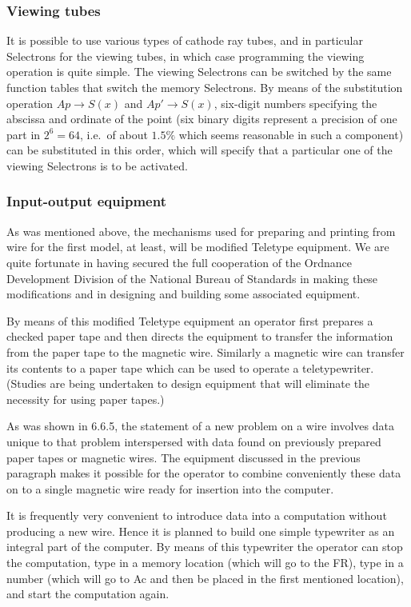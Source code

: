 \documentclass[12pt]{amsart}
\begin{document}
\subsubsection{Viewing tubes}
It is possible to use various types of cathode ray tubes, and in particular Selectrons for the viewing tubes, in which case programming the viewing operation is quite simple. The viewing Selectrons can be switched by the same function tables that switch the memory Selectrons. By means of the substitution operation $Ap \rightarrow S(x)$ and $Ap' \rightarrow S(x)$, six-digit numbers specifying the abscissa and ordinate of the point (six binary digits represent a precision of one part in $2^6 = 64$, i.e.\ of about $1.5\%$ which seems reasonable in such a component) can be substituted in this order, which will specify that a particular one of the viewing Selectrons is to be activated.

\subsubsection{Input-output equipment}
As was mentioned above, the mechanisms used for preparing and printing from wire for the first model, at least, will be modified Teletype equipment. We are quite fortunate in having secured the full cooperation of the Ordnance Development Division of the National Bureau of Standards in making these modifications and in designing and building some associated equipment.

By means of this modified Teletype equipment an operator first prepares a checked paper tape and then directs the equipment to transfer the information from the paper tape to the magnetic wire. Similarly a magnetic wire can transfer its contents to a paper tape which can be used to operate a teletypewriter. (Studies are being undertaken to design equipment that will eliminate the necessity for using paper tapes.)

As was shown in 6.6.5, the statement of a new problem on a wire involves data unique to that problem interspersed with data found on previously prepared paper tapes or magnetic wires. The equipment discussed in the previous paragraph makes it possible for the operator to combine conveniently these data on to a single magnetic wire ready for insertion into the computer.

It is frequently very convenient to introduce data into a computation without producing a new wire. Hence it is planned to build one simple typewriter as an integral part of the computer. By means of this typewriter the operator can stop the computation, type in a memory location (which will go to the FR), type in a number (which will go to Ac and then be placed in the first mentioned location), and start the computation again.
\end{document}
